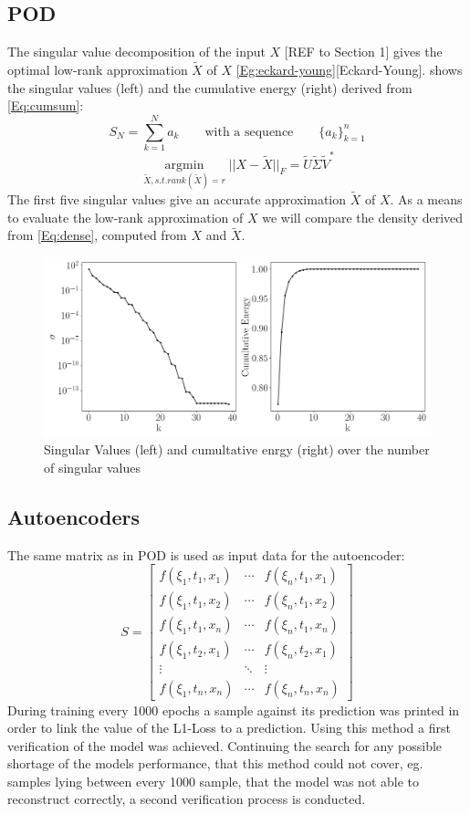 \documentclass[12pt, a4paper]{article}
\begin{document}
\subsection{POD}
The singular value decomposition of the input $X$ [REF to Section 1] gives the optimal low-rank approximation $\tilde{X}$ of $X$ \cref{Eg:eckard-young}[Eckard-Young].  shows the singular values (left) and the cumulative energy (right) derived from \cref{Eq:cumsum}:
\begin{equation}
S_N = \sum_{k=1}^{N}a_k \qquad\textrm{with a sequence} \qquad\{a_k\}_{k=1}^{n} 
\label{Eq:cumsum}
\end{equation}
\begin{equation}
\underset{\tilde{X}, s.t. rank(\tilde{X})=r}{\operatorname{argmin}} || X -\tilde{X} ||_F=\tilde{U}\tilde{\Sigma}\tilde{V}^*
\label{Eg:eckard-young}
\end{equation}
The first five singular values give an accurate approximation $\tilde{X}$ of $X$.  
As a means to evaluate the low-rank approximation of $X$ we will compare the density derived from \cref{Eq:dense}, computed from $X$ and $\tilde{X}$.
\begin{figure}[htb!]
	\centering
	\includegraphics[width=\textwidth]{Figures/Cumultative_Singular_Values_kn001.png}
	\caption{Singular Values (left) and cumultative enrgy (right) over the number of singular values}
	\label{Fig:cumu_sing}
\end{figure}
\subsection{Autoencoders}
The same matrix as in POD is used as input data for the autoencoder:
\[S = \begin{bmatrix}
f(\xi_1,t_1,x_1)&\cdots &f(\xi_n,t_1,x_1) \\
f(\xi_1,t_1,x_2)&\cdots &f(\xi_n,t_1,x_2) \\
f(\xi_1,t_1,x_n)&\cdots &f(\xi_n,t_1,x_n)\\
f(\xi_1,t_2,x_1)&\cdots &f(\xi_n,t_2,x_1)\\
\vdots & \ddots & \vdots\\
f(\xi_1,t_n,x_n)&\cdots &f(\xi_n,t_n,x_n)
\end{bmatrix}\]
During training every 1000 epochs a sample against its prediction was printed in order to link the value of the L1-Loss to a prediction. Using this method a first verification of the model was achieved. Continuing the search for any possible shortage of the models performance, that this method could not cover, eg. samples lying between every 1000 sample, that the model was not able to reconstruct correctly, a second verification process is conducted. 
\end{document}
